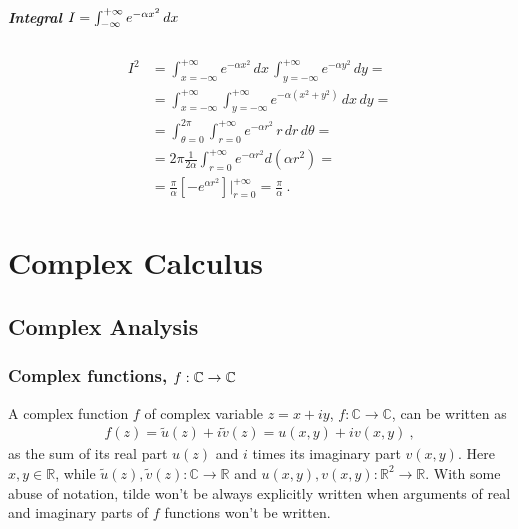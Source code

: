\documentclass[letterpaper,10pt,english]{jupyterBook}
\begin{document}
\label{\detokenize{ch/functional-analysis/dirac-delta:integral-e-x2}}\subsubsection*{Integral \protect\(I = \int_{-\infty}^{+\infty} e^{-\alpha x^2} \, dx\protect\)}
\begin{equation*}
\begin{split}\begin{aligned}
  I^2 
  & = \int_{x=-\infty}^{+\infty} e^{-\alpha x^2} \, dx \, \int_{y=-\infty}^{+\infty} e^{-\alpha y^2} \, dy = \\
  & = \int_{x=-\infty}^{+\infty} \int_{y=-\infty}^{+\infty} e^{-\alpha (x^2 + y^2)} \, dx \, dy = \\
  & = \int_{\theta=0}^{2\pi} \int_{r=0}^{+\infty} e^{-\alpha r^2} \, r \, dr \, d \theta = \\
  & = 2 \pi \frac{1}{2 \alpha} \int_{r=0}^{+\infty} e^{-\alpha r^2} d \left(\alpha r^2 \right) = \\
  & = \frac{\pi}{\alpha} \left[ - e^{\alpha r^2} \right]\bigg|_{r = 0}^{+\infty} = \frac{\pi}{\alpha} \ .
\end{aligned}\end{split}
\end{equation*}
\sphinxstepscope


\part{Complex Calculus}

\sphinxstepscope


\chapter{Complex Analysis}
\label{\detokenize{ch/complex/analysis:complex-analysis}}\label{\detokenize{ch/complex/analysis:id1}}\label{\detokenize{ch/complex/analysis::doc}}

\section{Complex functions, \protect\(f: \mathbb{C} \rightarrow \mathbb{C}\protect\)}
\label{\detokenize{ch/complex/analysis:complex-functions-f-mathbb-c-rightarrow-mathbb-c}}\label{\detokenize{ch/complex/analysis:complex-analysis-fun}}
\sphinxAtStartPar
A complex function \(f\) of complex variable \(z = x + i y\), \(f: \mathbb{C} \rightarrow \mathbb{C}\), can be written as
\begin{equation*}
\begin{split}f(z) = \tilde{u}(z) + i \tilde{v}(z) = u(x,y) + i v(x,y) \ ,\end{split}
\end{equation*}
\sphinxAtStartPar
as the sum of its real part \(u(z)\) and \(i\) times its imaginary part \(v(x,y)\). Here \(x,y \in \mathbb{R}\), while \(\tilde{u}(z), \tilde{v}(z): \mathbb{C} \rightarrow \mathbb{R}\) and \(u(x,y), v(x,y): \mathbb{R}^2 \rightarrow \mathbb{R}\). With some abuse of notation, tilde won’t be always explicitly written when arguments of real and imaginary parts of \(f\) functions won’t be written.
\end{document}
